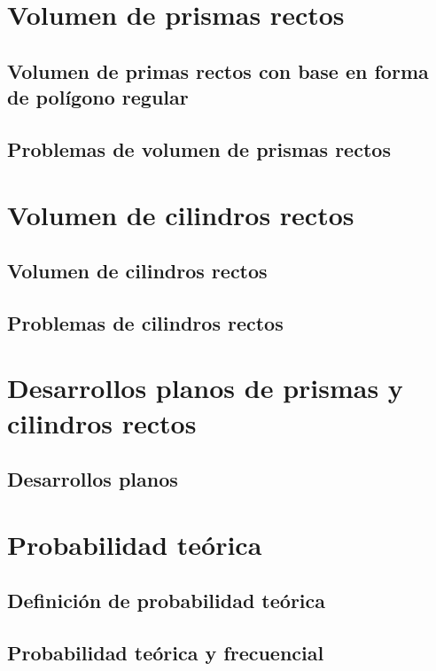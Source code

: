 \documentclass[11pt]{book}
\begin{document}
\section{Volumen de prismas rectos}
\subsection{Volumen de primas rectos con base en forma de polígono regular}
\subsection{Problemas de volumen de prismas rectos}

\section{Volumen de cilindros rectos}
\subsection{Volumen de cilindros rectos}
\subsection{Problemas de cilindros rectos}

\section{Desarrollos planos de prismas y cilindros rectos}
\subsection{Desarrollos planos}

\section{Probabilidad teórica}
\subsection{Definición de probabilidad teórica}
\subsection{Probabilidad teórica y frecuencial}
\end{document}
